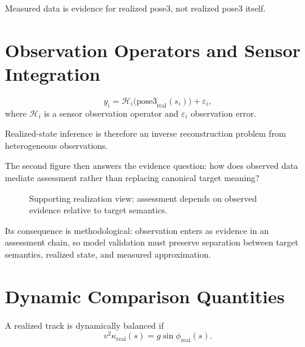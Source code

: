 \begin{principle}
\label{princ:measured-state-ambiguity}
Measured data is evidence for realized pose3, not realized pose3 itself.
\end{principle}

\section{Observation Operators and Sensor Integration}

\begin{definition}
\label{def:sensor-observation-model}
\[
y_i
=
\mathcal H_i\bigl(\mathrm{pose3}_{\mathrm{real}}(s_i)\bigr)
+
\varepsilon_i,
\]
where \(\mathcal H_i\) is a sensor observation operator and
\(\varepsilon_i\) observation error.
\end{definition}

Realized-state inference is therefore an inverse reconstruction problem
from heterogeneous observations.

The second figure then answers the evidence question: how does observed
data mediate assessment rather than replacing canonical target meaning?

\begin{figure}[ht]
\centering

\caption{Supporting realization view: assessment depends on observed evidence relative to target semantics.}
\label{fig:support-target-observed-assessment}
\end{figure}

Its consequence is methodological: observation enters as evidence in an
assessment chain, so model validation must preserve separation between
target semantics, realized state, and measured approximation.

\section{Dynamic Comparison Quantities}

\begin{definition}
\label{def:realized-equilibrium-condition}
A realized track is dynamically balanced if
\[
v^2\kappa_{\mathrm{real}}(s)=g\sin\phi_{\mathrm{real}}(s).
\]
\end{definition}

